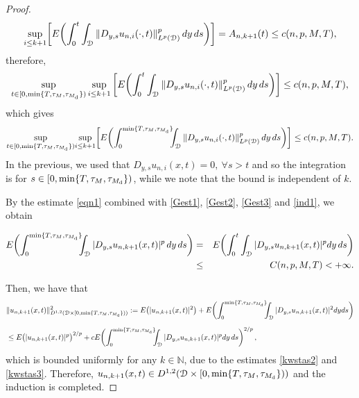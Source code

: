 \documentclass[reqno]{amsart}
\numberwithin{equation}{section}
\newcommand{\mN}{\mathbb{N}}
\newcommand{\cd}{\mathcal{D}}
\begin{document}
\begin{proof}
\begin{equation*}
\underset{i\leq k+1}{\text{sup}}\bigg{[}E\biggl{(}\int_{0}^{t}\int_{\cd}\|D_{y,s}u_{n,i}(\cdot,t)\|^p_{L^p(\cd)}\, dy\,ds\biggr{)}\bigg{]}=A_{n,k+1}(t)\leq
c(n,p,M,T),
\end{equation*}
therefore,
\begin{equation}\label{ind1}
\sup_{t\in[0,\min\{T,\tau_M,\tau_{M_{\rm d}}\})} \sup_{i\leq
k+1} \bigg{[}E\biggl{(}\int_0^t\int_{\cd}\|D_{y,s}u_{n,i}(\cdot,t)\|^p_{L^p(\cd)}\,
dy\,ds\biggr{)}\bigg{]}\leq c(n,p,M,T),
\end{equation}
which gives
$$\underset{t\in[0,\min\{T,\tau_M,\tau_{M_{\rm d}}\})}{\text{sup}}\underset{i\leq k+1}{\text{sup}}\bigg{[}E\biggl{(}\int_0^{\min\{T,\tau_M,\tau_{M_{\rm d}}\}}\hspace*{-0.2cm}
\int_{\cd}\|D_{y,s}u_{n,i}(\cdot,t)\|^p_{L^p(\cd)}\,dy\,ds\biggr{)}\bigg{]}\leq
 c(n,p,M,T).$$
In the previous, we used that $D_{y,s}u_{n,i}(x,t)=0,\ \forall
s>t$ and so the integration is for $ s\in[0,\min\{T,\tau_M,\tau_{M_{\rm d}}\})$, while we note that the bound is independent of $k$.

By the estimate \eqref{eqn1} combined with \eqref{Gest1}, \eqref{Gest2}, \eqref{Gest3} and \eqref{ind1}, we obtain

\begin{eqnarray}\label{kwstas3}
E\biggl(\int_0^{\min\{T,\tau_M,\tau_{M_{\rm d}}\}}\hspace*{-0.2cm}
\int_{\cd}|D_{y,s}u_{n,k+1}(x,t)|^p \,dy\,ds\biggr)
\nonumber
&=&
E\biggl(\int_0^t \int_{\cd}|D_{y,s}u_{n,k+1}(x,t)|^p dy\,ds\biggr)
\\
&\leq & C(n,p,M,T)<+\infty .
\end{eqnarray}

Then, we have that
\allowdisplaybreaks
\begin{align*}
&\|u_{n,k+1}(x,t)\|^{2}_{D^{1,2}(\cd\times[0,\min\{T,\tau_M,\tau_{M_{\rm d}}\}))}:=
E\bigl{(}|u_{n,k+1}(x,t)|^{2}\bigr{)}+E\biggl{(}\int_{0}^{\min\{T,\tau_M,\tau_{M_{\rm d}}\}}\hspace*{-0.2cm}\int_{\cd}|D_{y,s}u_{n,k+1}(x,t)|^2 dy ds\biggr{)}
\\[0.2cm]
&\leq  E\bigl(|u_{n,k+1}(x,t)|^p\bigr)^{2/p}+ c E\biggl(\int_0^{\min\{T,\tau_M,\tau_{M_{\rm d}}\}}\hspace*{-0.2cm}
\int_{\cd}|D_{y,s}u_{n,k+1}(x,t)|^p dy\,ds\biggr)^{2/p}\,,
\end{align*}
which is bounded uniformly for any $k\in\mN$, due to the estimates \eqref{kwstas2} and \eqref{kwstas3}. Therefore, $ u_{n,k+1}(x,t)\in
D^{1,2}(\cd\times[0,\min\{T,\tau_M,\tau_{M_{\rm
d}}\})) $ and the induction is completed.


\end{proof}
\end{document}

